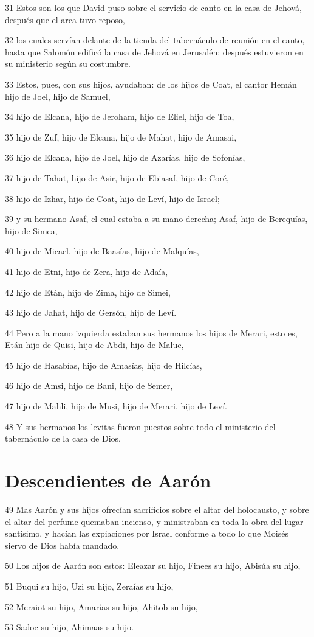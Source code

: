 \par 31 Estos son los que David puso sobre el servicio de canto en la casa de Jehová, después que el arca tuvo reposo,
\par 32 los cuales servían delante de la tienda del tabernáculo de reunión en el canto, hasta que Salomón edificó la casa de Jehová en Jerusalén; después estuvieron en su ministerio según su costumbre.
\par 33 Estos, pues, con sus hijos, ayudaban: de los hijos de Coat, el cantor Hemán hijo de Joel, hijo de Samuel,
\par 34 hijo de Elcana, hijo de Jeroham, hijo de Eliel, hijo de Toa, 
\par 35 hijo de Zuf, hijo de Elcana, hijo de Mahat, hijo de Amasai,
\par 36 hijo de Elcana, hijo de Joel, hijo de Azarías, hijo de Sofonías,
\par 37 hijo de Tahat, hijo de Asir, hijo de Ebiasaf, hijo de Coré,
\par 38 hijo de Izhar, hijo de Coat, hijo de Leví, hijo de Israel;
\par 39 y su hermano Asaf, el cual estaba a su mano derecha; Asaf, hijo de Berequías, hijo de Simea,
\par 40 hijo de Micael, hijo de Baasías, hijo de Malquías,
\par 41 hijo de Etni, hijo de Zera, hijo de Adaía,
\par 42 hijo de Etán, hijo de Zima, hijo de Simei,
\par 43 hijo de Jahat, hijo de Gersón, hijo de Leví.
\par 44 Pero a la mano izquierda estaban sus hermanos los hijos de Merari, esto es, Etán hijo de Quisi, hijo de Abdi, hijo de Maluc,
\par 45 hijo de Hasabías, hijo de Amasías, hijo de Hilcías,
\par 46 hijo de Amsi, hijo de Bani, hijo de Semer,
\par 47 hijo de Mahli, hijo de Musi, hijo de Merari, hijo de Leví.
\par 48 Y sus hermanos los levitas fueron puestos sobre todo el ministerio del tabernáculo de la casa de Dios.

\section*{Descendientes de Aarón}

\par 49 Mas Aarón y sus hijos ofrecían sacrificios sobre el altar del holocausto, y sobre el altar del perfume quemaban incienso, y ministraban en toda la obra del lugar santísimo, y hacían las expiaciones por Israel conforme a todo lo que Moisés siervo de Dios había mandado.
\par 50 Los hijos de Aarón son estos: Eleazar su hijo, Finees su hijo, Abisúa su hijo,
\par 51 Buqui su hijo, Uzi su hijo, Zeraías su hijo,
\par 52 Meraiot su hijo, Amarías su hijo, Ahitob su hijo,
\par 53 Sadoc su hijo, Ahimaas su hijo.

